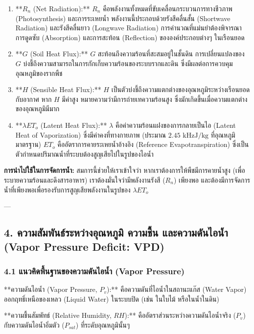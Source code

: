 \documentclass[11pt,a4paper,openany]{report}
\begin{document}
\begin{enumerate}
  \item **$R_n$ (Net Radiation):**
  $R_n$ คือพลังงานทั้งหมดที่ขับเคลื่อนกระบวนการทางชีวภาพ (Photosynthesis) และการระเหยน้ำ พลังงานนี้ประกอบด้วยรังสีคลื่นสั้น (Shortwave Radiation) และรังสีคลื่นยาว (Longwave Radiation) การคำนวณที่แม่นยำต้องพิจารณาการดูดซับ (Absorption) และการสะท้อน (Reflection) ขององค์ประกอบต่างๆ ในเรือนยอด
  \item **$G$ (Soil Heat Flux):**
  $G$ สะท้อนถึงความร้อนที่สะสมอยู่ในชั้นดิน การเปลี่ยนแปลงของ $G$ บ่งชี้ถึงความสามารถในการกักเก็บความร้อนของระบบรากและดิน ซึ่งมีผลต่อการควบคุมอุณหภูมิของรากพืช
  \item **$H$ (Sensible Heat Flux):**
  $H$ เป็นตัวบ่งชี้ถึงความแตกต่างของอุณหภูมิระหว่างเรือนยอดกับอากาศ หาก $H$ มีค่าสูง หมายความว่ามีการถ่ายเทความร้อนสูง ซึ่งมักเกิดขึ้นเมื่อความแตกต่างของอุณหภูมิมีมาก
  \item **$\lambda ET_o$ (Latent Heat Flux):**
  $\lambda$ คือค่าความร้อนแฝงของการกลายเป็นไอ (Latent Heat of Vaporization) ซึ่งมีค่าคงที่ทางกายภาพ (ประมาณ $2.45 \text{ kHzJ}/\text{kg}$ ที่อุณหภูมิมาตรฐาน) $ET_o$ คืออัตราการคายระเหยน้ำอ้างอิง (Reference Evapotranspiration) ซึ่งเป็นตัวกำหนดปริมาณน้ำที่ระบบต้องสูญเสียไปในรูปของไอน้ำ
\end{enumerate}


\textbf{การนำไปใช้ในการจัดการน้ำ:}
สมการนี้ช่วยให้เราเข้าใจว่า หากเราต้องการให้พืชมีการคายน้ำสูง (เพื่อระบายความร้อนและดึงสารอาหาร) เราต้องมั่นใจว่ามีพลังงานรังสี ($R_n$) เพียงพอ และต้องมีการจัดการน้ำที่เพียงพอเพื่อรองรับการสูญเสียพลังงานในรูปของ $\lambda ET_o$

---

\subsection{4. ความสัมพันธ์ระหว่างอุณหภูมิ ความชื้น และความดันไอน้ำ (Vapor Pressure Deficit: VPD)}


\subsubsection{4.1 แนวคิดพื้นฐานของความดันไอน้ำ (Vapor Pressure)}


**ความดันไอน้ำ (Vapor Pressure, $P_v$):**
คือความดันที่ไอน้ำในสถานะแก๊ส (Water Vapor) ออกฤทธิ์เหนือของเหลว (Liquid Water) ในระบบปิด (เช่น ในใบไม้ หรือในน้ำในดิน)

**ความชื้นสัมพัทธ์ (Relative Humidity, $RH$):**
คืออัตราส่วนระหว่างความดันไอน้ำจริง ($P_v$) กับความดันไอน้ำอิ่มตัว ($P_{sat}$) ที่ระดับอุณหภูมินั้นๆ
\end{document}
